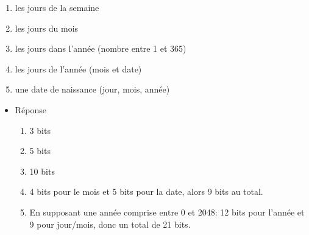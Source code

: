\documentclass[letter, oneside]{book}
\begin{document}
\begin{itemize}
\begin{enumerate}
\item les jours de la semaine

\item les jours du mois

\item les jours dans l'année (nombre entre 1 et 365)

\item les jours de l'année (mois et date)

\item une date de naissance (jour, mois, année)
\end{enumerate}

\begin{itemize}
\item Réponse
\label{sec:orge4644bd}
\begin{enumerate}
\item 3 bits

\item 5 bits

\item 10 bits

\item 4 bits pour le mois et 5 bits pour la date, alors 9 bits au total.

\item En supposant une année comprise entre 0 et 2048: 12 bits pour
l'année et 9 pour jour/mois, donc un total de 21 bits.
\end{enumerate}
\end{itemize}
\end{itemize}
\end{document}
